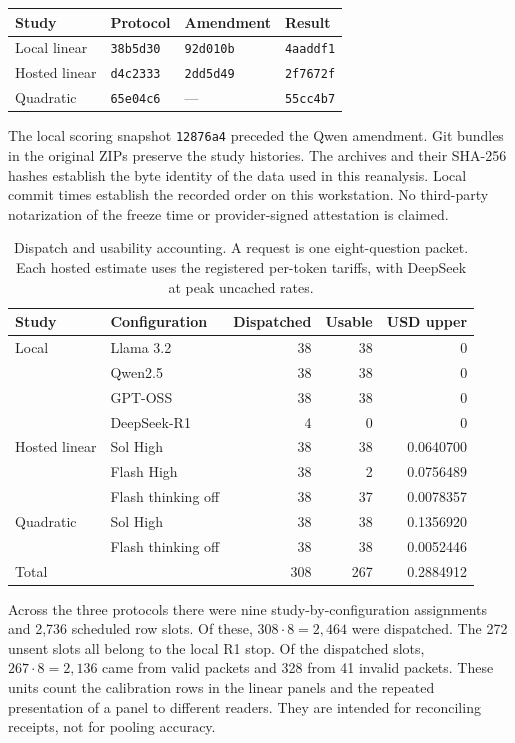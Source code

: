 \documentclass[12pt,letterpaper]{article}
\begin{document}
\begin{center}\small
\begin{tabular*}{\linewidth}{@{\extracolsep{\fill}}llll@{}}\toprule
Study & Protocol & Amendment & Result\\\midrule
Local linear &\texttt{38b5d30} &\texttt{92d010b} &\texttt{4aaddf1}\\
Hosted linear &\texttt{d4c2333} &\texttt{2dd5d49} &\texttt{2f7672f}\\
Quadratic &\texttt{65e04c6} & --- &\texttt{55cc4b7}\\\bottomrule
\end{tabular*}
\end{center}
The local scoring snapshot \texttt{12876a4} preceded the Qwen amendment. Git bundles in the original ZIPs preserve the study histories. The archives and their SHA-256 hashes establish the byte identity of the data used in this reanalysis. Local commit times establish the recorded order on this workstation. No third-party notarization of the freeze time or provider-signed attestation is claimed.

\begin{table}[htbp]\centering\small
\caption{Dispatch and usability accounting. A request is one eight-question packet. Each hosted estimate uses the registered per-token tariffs, with DeepSeek at peak uncached rates.}\label{tab:resource}
\begin{tabular}{@{}llrrr@{}}\toprule
Study & Configuration & Dispatched & Usable & USD upper\\\midrule
Local & Llama 3.2 &38&38&0\\
& Qwen2.5 &38&38&0\\
& GPT-OSS &38&38&0\\
& DeepSeek-R1 &4&0&0\\\midrule
Hosted linear & Sol High &38&38&0.0640700\\
& Flash High &38&2&0.0756489\\
& Flash thinking off &38&37&0.0078357\\\midrule
Quadratic & Sol High &38&38&0.1356920\\
& Flash thinking off &38&38&0.0052446\\\midrule
Total &&308&267&0.2884912\\\bottomrule
\end{tabular}
\end{table}

Across the three protocols there were nine study-by-configuration assignments and 2,736 scheduled row slots. Of these, $308\cdot8=2,464$ were dispatched. The 272 unsent slots all belong to the local R1 stop. Of the dispatched slots, $267\cdot8=2,136$ came from valid packets and 328 from 41 invalid packets. These units count the calibration rows in the linear panels and the repeated presentation of a panel to different readers. They are intended for reconciling receipts, not for pooling accuracy.
\end{document}
